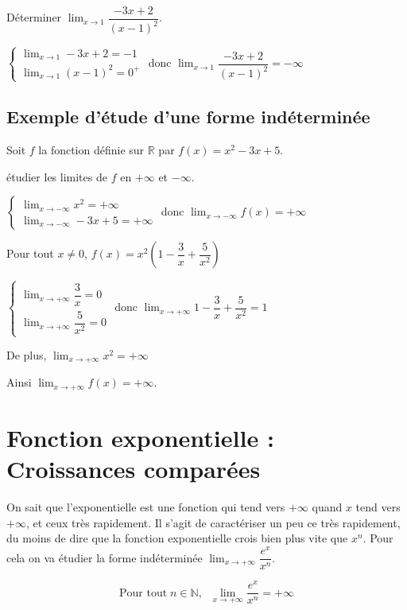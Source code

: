 \documentclass[french]{book}
\newcommand{\R}{\mathbb {R}}
\newcommand{\ds}{\displaystyle}
\newcommand{\limite}[2][x]{\ds\lim_{#1\rightarrow #2}}
\newcommand{\limpinf}[1][x]{\ds\lim_{#1\rightarrow +\infty}}
\newcommand{\limminf}[1][x]{\ds\lim_{#1\rightarrow -\infty}}
\begin{document}
\begin{exemple}
D\'eterminer $\limite[x]{1}\dfrac{-3x+2}{(x-1)^{2}}$.
\end{exemple}


$\left\lbrace
\begin{array}{l}
\limite[x]{1}-3x+2=-1 \\
\limite[x]{1}(x-1)^{2}=0^{+}
\end{array}
\right.$
donc $\limite[x]{1}\dfrac{-3x+2}{(x-1)^{2}}=-\infty$

\subsection{Exemple d'\'etude d'une forme ind\'etermin\'ee}
Soit $f$ la fonction d\'efinie sur $\R$ par $f(x)=x^{2}-3x+5$.

\'etudier les limites de $f$ en $+\infty$ et $-\infty$.


$\left\lbrace
\begin{array}{l}
\limminf x^{2}=+\infty \\
\limminf -3x+5=+\infty
\end{array}
\right.$
donc $\limminf f(x)=+\infty$

Pour tout $x\neq0$, $f(x)=x^{2}\left(1-\dfrac{3}{x}+\dfrac{5}{x^{2}}\right)$

$\left\lbrace
\begin{array}{l}
\limpinf \dfrac{3}{x}=0\\
\limpinf \dfrac{5}{x^{2}}=0
\end{array}
\right.$
donc $\limpinf 1-\dfrac{3}{x}+\dfrac{5}{x^{2}}=1$

De plus, $\limpinf x^{2}=+\infty$

Ainsi $\limpinf f(x)=+\infty$.

\newpage
\section{Fonction exponentielle : Croissances comparées}
On sait que l'exponentielle est une fonction qui tend vers $+ \infty$ quand $x$ tend vers $+ \infty$, et ceux très rapidement.  Il s'agit de caractériser un peu ce très rapidement, du moins de dire que la fonction exponentielle crois bien plus vite que $x^n$. Pour cela on va étudier la forme indéterminée $\limpinf \dfrac{e^x}{x^n} $. 

\begin{thm}
$$ \text{Pour tout} \; n \in \mathbb{N}, \;\;\limpinf \dfrac{e^x}{x^n}= +\infty$$
\end{thm} 
\end{document}

